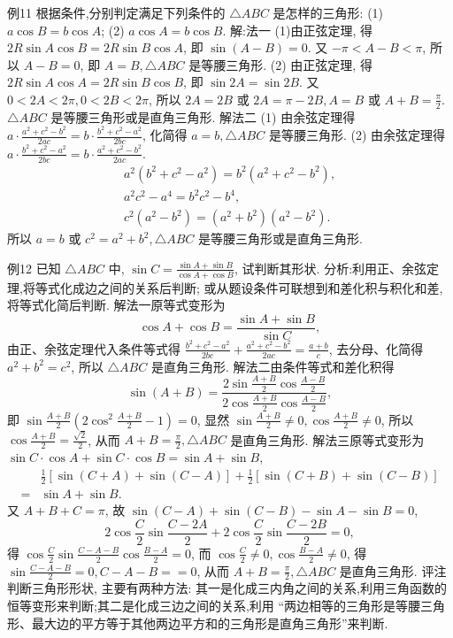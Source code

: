例11 根据条件,分别判定满足下列条件的 $\triangle A B C$ 是怎样的三角形:
(1) $a \cos B=b \cos A$;
(2) $a \cos A=b \cos B$.
解:法一 (1)由正弦定理, 得 $2 R \sin A \cos B=2 R \sin B \cos A$, 即 $\sin (A- B)=0$.
又 $-\pi<A-B<\pi$, 所以 $A-B=0$, 即 $A=B, \triangle A B C$ 是等腰三角形.
(2) 由正弦定理, 得 $2 R \sin A \cos A=2 R \sin B \cos B$, 即 $\sin 2 A=\sin 2 B$.
又 $0<2 A<2 \pi, 0<2 B<2 \pi$, 所以 $2 A=2 B$ 或 $2 A=\pi-2 B, A=B$ 或 $A+B=\frac{\pi}{2}$.
$\triangle A B C$ 是等腰三角形或是直角三角形.
解法二 (1) 由余弦定理得 $a \cdot \frac{a^2+c^2-b^2}{2 a c}=b \cdot \frac{b^2+c^2-a^2}{2 b c}$, 
化简得 $a=b, \triangle A B C$ 是等腰三角形.
(2) 由余弦定理得 $a \cdot \frac{b^2+c^2-a^2}{2 b c}=b \cdot \frac{a^2+c^2-b^2}{2 a c}$.
$$
\begin{gathered}
a^2\left(b^2+c^2-a^2\right)=b^2\left(a^2+c^2-b^2\right), \\
a^2 c^2-a^4=b^2 c^2-b^4, \\
c^2\left(a^2-b^2\right)=\left(a^2+b^2\right)\left(a^2-b^2\right) .
\end{gathered}
$$
所以 $a=b$ 或 $c^2=a^2+b^2, \triangle A B C$ 是等腰三角形或是直角三角形.



例12 已知 $\triangle A B C$ 中, $\sin C=\frac{\sin A+\sin B}{\cos A+\cos B}$, 试判断其形状.
分析:利用正、余弦定理,将等式化成边之间的关系后判断; 或从题设条件可联想到和差化积与积化和差, 将等式化简后判断.
解法一原等式变形为
$$
\cos A+\cos B=\frac{\sin A+\sin B}{\sin C},
$$
由正、余弦定理代入条件等式得 $\frac{b^2+c^2-a^2}{2 b c}+\frac{a^2+c^2-b^2}{2 a c}=\frac{a+b}{c}$, 去分母、化简得 $a^2+b^2=c^2$, 所以 $\triangle A B C$ 是直角三角形.
解法二由条件等式和差化积得
$$
\sin (A+B)=\frac{2 \sin \frac{A+B}{2} \cos \frac{A-B}{2}}{2 \cos \frac{A+B}{2} \cos \frac{A-B}{2}},
$$
即 $\sin \frac{A+B}{2}\left(2 \cos ^2 \frac{A+B}{2}-1\right)=0$, 显然 $\sin \frac{A+B}{2} \neq 0, \cos \frac{A+B}{2} \neq 0$, 所以 $\cos \frac{A+B}{2}=\frac{\sqrt{2}}{2}$, 从而 $A+B=\frac{\pi}{2}, \triangle A B C$ 是直角三角形.
解法三原等式变形为 $\sin C \cdot \cos A+\sin C \cdot \cos B=\sin A+\sin B$,
$$
\begin{aligned}
& \frac{1}{2}[\sin (C+A)+\sin (C-A)]+\frac{1}{2}[\sin (C+B)+\sin (C-B)] \\
= & \sin A+\sin B .
\end{aligned}
$$
又 $A+B+C=\pi$, 故 $\sin (C-A)+\sin (C-B)-\sin A-\sin B=0$,
$$
2 \cos \frac{C}{2} \sin \frac{C-2 A}{2}+2 \cos \frac{C}{2} \sin \frac{C-2 B}{2}=0,
$$
得 $\cos \frac{C}{2} \sin \frac{C-A-B}{2} \cos \frac{B-A}{2}=0$, 而 $\cos \frac{C}{2} \neq 0, \cos \frac{B-A}{2} \neq 0$, 得 $\sin \frac{C-A-B}{2}=0, C-A-B==0$, 从而 $A+B=\frac{\pi}{2}, \triangle A B C$ 是直角三角形.
评注判断三角形形状, 主要有两种方法: 其一是化成三内角之间的关系,利用三角函数的恒等变形来判断;其二是化成三边之间的关系,利用 “两边相等的三角形是等腰三角形、最大边的平方等于其他两边平方和的三角形是直角三角形”来判断.



